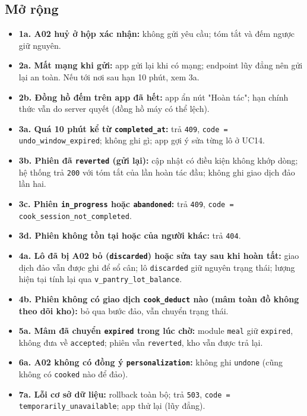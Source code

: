 \subsection{Mở rộng}
\begin{itemize}
\item \textbf{1a. A02 huỷ ở hộp xác nhận:} không gửi yêu cầu; tóm tắt và đếm ngược giữ nguyên.
\item \textbf{2a. Mất mạng khi gửi:} app gửi lại khi có mạng; endpoint lũy đẳng nên gửi lại an toàn. Nếu tới nơi sau hạn 10 phút, xem 3a.
\item \textbf{2b. Đồng hồ đếm trên app đã hết:} app ẩn nút "Hoàn tác"; hạn chính thức vẫn do server quyết (đồng hồ máy có thể lệch).
\item \textbf{3a. Quá 10 phút kể từ {\small\texttt{completed\_\allowbreak{}\allowbreak{}at}}:} trả {\small\texttt{409}}, {\small\texttt{code = undo\_\allowbreak{}\allowbreak{}window\_\allowbreak{}\allowbreak{}expired}}; không ghi gì; app gợi ý sửa từng lô ở UC14.
\item \textbf{3b. Phiên đã {\small\texttt{reverted}} (gửi lại):} cập nhật có điều kiện không khớp dòng; hệ thống trả {\small\texttt{200}} với tóm tắt của lần hoàn tác đầu; không ghi giao dịch đảo lần hai.
\item \textbf{3c. Phiên {\small\texttt{in\_\allowbreak{}\allowbreak{}progress}} hoặc {\small\texttt{abandoned}}:} trả {\small\texttt{409}}, {\small\texttt{code = cook\_\allowbreak{}\allowbreak{}session\_\allowbreak{}\allowbreak{}not\_\allowbreak{}\allowbreak{}completed}}.
\item \textbf{3d. Phiên không tồn tại hoặc của người khác:} trả {\small\texttt{404}}.
\item \textbf{4a. Lô đã bị A02 bỏ ({\small\texttt{discarded}}) hoặc sửa tay sau khi hoàn tất:} giao dịch đảo vẫn được ghi để sổ cân; lô {\small\texttt{discarded}} giữ nguyên trạng thái; lượng hiện tại tính lại qua {\small\texttt{v\_\allowbreak{}\allowbreak{}pantry\_\allowbreak{}\allowbreak{}lot\_\allowbreak{}\allowbreak{}balance}}.
\item \textbf{4b. Phiên không có giao dịch {\small\texttt{cook\_\allowbreak{}\allowbreak{}deduct}} nào (mâm toàn đồ không theo dõi kho):} bỏ qua bước đảo, vẫn chuyển trạng thái.
\item \textbf{5a. Mâm đã chuyển {\small\texttt{expired}} trong lúc chờ:} module {\small\texttt{meal}} giữ {\small\texttt{expired}}, không đưa về {\small\texttt{accepted}}; phiên vẫn {\small\texttt{reverted}}, kho vẫn được trả lại.
\item \textbf{6a. A02 không có đồng ý {\small\texttt{personalization}}:} không ghi {\small\texttt{undone}} (cũng không có {\small\texttt{cooked}} nào để đảo).
\item \textbf{7a. Lỗi cơ sở dữ liệu:} rollback toàn bộ; trả {\small\texttt{503}}, {\small\texttt{code = temporarily\_\allowbreak{}\allowbreak{}unavailable}}; app thử lại (lũy đẳng).
\end{itemize}
